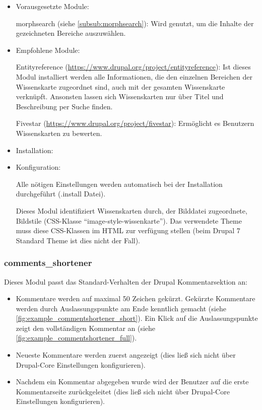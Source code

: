 \begin{itemize}[parsep=0pt, itemsep=5.0pt plus 2.0pt minus 1.0pt, leftmargin=*]
	\item Vorausgesetzte Module:
	
	morphsearch (siehe \cref{subsub:morphsearch}): Wird genutzt, um die Inhalte der gezeichneten Bereiche auszuwählen.
	
	
	\item Empfohlene Module: 
	
	Entityreference (\url{https://www.drupal.org/project/entityreference}): Ist dieses Modul installiert werden alle Informationen, die den einzelnen Bereichen der Wissenskarte zugeordnet sind, auch mit der gesamten Wissenskarte verknüpft. Ansonsten lassen sich Wissenskarten nur über Titel und Beschreibung per Suche finden.
	
	Fivestar (\url{https://www.drupal.org/project/fivestar}): Ermöglicht es Benutzern Wissenskarten zu bewerten.
	
	
	\item Installation: \standardinstall
	
	
	\item Konfiguration:
	
	\noconfig
	
	Alle nötigen Einstellungen werden automatisch bei der Installation durchgeführt (.install Datei).

	Dieses Modul identifiziert Wissenskarten durch, der Bilddatei zugeordnete, Bildstile (\zB CSS-Klasse \enquote{image-style-wissenkarte}). Das verwendete Theme muss diese CSS-Klassen im HTML zur verfügung stellen (beim Drupal 7 Standard Theme ist dies nicht der Fall).
\end{itemize}



\subsubsection{comments\_shortener}\label{subsub:commentsshortener}
Dieses Modul passt das Standard-Verhalten der Drupal Kommentarsektion an:

\begin{itemize}
	\item Kommentare werden auf maximal 50 Zeichen gekürzt. Gekürzte Kommentare werden durch Auslassungspunkte am Ende kenntlich gemacht (siehe \cref{fig:example_commentshortener_short}). Ein Klick auf die Auslassungspunkte zeigt den vollständigen Kommentar an (siehe \cref{fig:example_commentshortener_full}).
	
	\item Neueste Kommentare werden zuerst angezeigt (dies ließ sich nicht über Drupal-Core Einstellungen konfigurieren).
	
	\item Nachdem ein Kommentar abgegeben wurde wird der Benutzer auf die erste Kommentarseite zurückgeleitet (dies ließ sich nicht über Drupal-Core Einstellungen konfigurieren).
\end{itemize}


